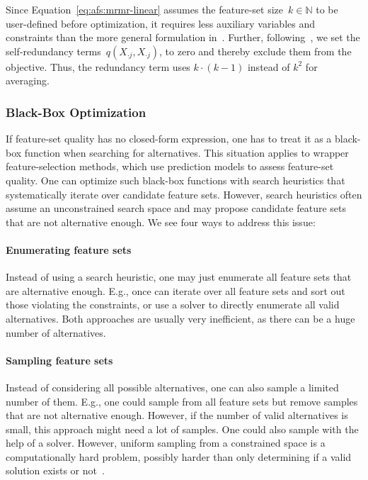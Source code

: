 \documentclass{article}
\theoremstyle{definition}
\begin{document}
Since Equation~\ref{eq:afs:mrmr-linear} assumes the feature-set size~$k \in \mathbb{N}$ to be user-defined before optimization, it requires less auxiliary variables and constraints than the more general formulation in~\cite{nguyen2009optimizing, nguyen2010towards}.
Further, following~\cite{nguyen2014effective}, we set the self-redundancy terms~$q(X_{\cdot{}j},X_{\cdot{}j})$, to zero and thereby exclude them from the objective.
Thus, the redundancy term uses $k \cdot (k-1)$ instead of $k^2$ for averaging.

\subsubsection{Black-Box Optimization}
\label{sec:afs:approach:objectives:black-box}

If feature-set quality has no closed-form expression, one has to treat it as a black-box function when searching for alternatives.
This situation applies to wrapper feature-selection methods, which use prediction models to assess feature-set quality.
One can optimize such black-box functions with search heuristics that systematically iterate over candidate feature sets.
However, search heuristics often assume an unconstrained search space and may propose candidate feature sets that are not alternative enough.
We see four ways to address this issue:

\paragraph{Enumerating feature sets}

Instead of using a search heuristic, one may just enumerate all feature sets that are alternative enough.
E.g., once can iterate over all feature sets and sort out those violating the constraints, or use a solver to directly enumerate all valid alternatives.
Both approaches are usually very inefficient, as there can be a huge number of alternatives.

\paragraph{Sampling feature sets}

Instead of considering all possible alternatives, one can also sample a limited number of them.
E.g., one could sample from all feature sets but remove samples that are not alternative enough.
However, if the number of valid alternatives is small, this approach might need a lot of samples.
One could also sample with the help of a solver.
However, uniform sampling from a constrained space is a computationally hard problem, possibly harder than only determining if a valid solution exists or not~\cite{ermon2012uniform}.
\end{document}
